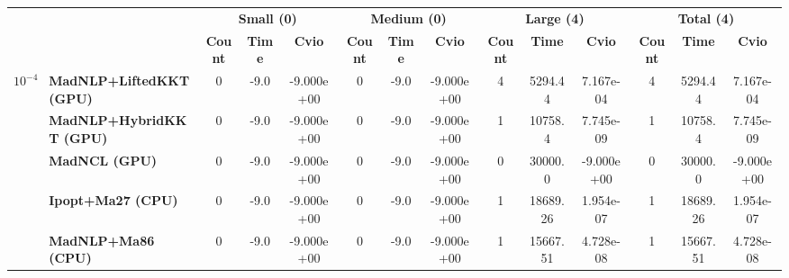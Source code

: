 \begin{center}
\renewcommand{\arraystretch}{0.9}
\begin{tabular}{|l|l|ccc|ccc|ccc|ccc|}
\hline
 & & \multicolumn{3}{c|}{\textbf{Small (0)}} & \multicolumn{3}{c|}{\textbf{Medium (0)}} & \multicolumn{3}{c|}{\textbf{Large (4)}} & \multicolumn{3}{c|}{\textbf{Total (4)}} \\
 & & \textbf{Count} & \textbf{Time} & \textbf{Cvio} & \textbf{Count} & \textbf{Time} & \textbf{Cvio} & \textbf{Count} & \textbf{Time} & \textbf{Cvio} & \textbf{Count} & \textbf{Time} & \textbf{Cvio}\\
\hline
\multirow{5}{*}{\Large\textbf{$10^{-4}$}} & \textbf{MadNLP+LiftedKKT (GPU)} & \cellcolor{blue!15}0 & \cellcolor{blue!15}-9.0 & \cellcolor{blue!15}-9.000e+00 & \cellcolor{blue!15}0 & \cellcolor{blue!15}-9.0 & \cellcolor{blue!15}-9.000e+00 & \cellcolor{blue!15}4 & \cellcolor{blue!15}5294.44 & 7.167e-04 & \cellcolor{blue!15}4 & \cellcolor{blue!15}5294.44 & 7.167e-04 \\
 & \textbf{MadNLP+HybridKKT (GPU)} & \cellcolor{blue!15}0 & \cellcolor{blue!15}-9.0 & \cellcolor{blue!15}-9.000e+00 & \cellcolor{blue!15}0 & \cellcolor{blue!15}-9.0 & \cellcolor{blue!15}-9.000e+00 & 1 & 10758.4 & 7.745e-09 & 1 & 10758.4 & 7.745e-09 \\
 & \textbf{MadNCL (GPU)} & \cellcolor{blue!15}0 & \cellcolor{blue!15}-9.0 & \cellcolor{blue!15}-9.000e+00 & \cellcolor{blue!15}0 & \cellcolor{blue!15}-9.0 & \cellcolor{blue!15}-9.000e+00 & 0 & 30000.0 & \cellcolor{blue!15}-9.000e+00 & 0 & 30000.0 & \cellcolor{blue!15}-9.000e+00 \\
 & \textbf{Ipopt+Ma27 (CPU)} & \cellcolor{blue!15}0 & \cellcolor{blue!15}-9.0 & \cellcolor{blue!15}-9.000e+00 & \cellcolor{blue!15}0 & \cellcolor{blue!15}-9.0 & \cellcolor{blue!15}-9.000e+00 & 1 & 18689.26 & 1.954e-07 & 1 & 18689.26 & 1.954e-07 \\
 & \textbf{MadNLP+Ma86 (CPU)} & \cellcolor{blue!15}0 & \cellcolor{blue!15}-9.0 & \cellcolor{blue!15}-9.000e+00 & \cellcolor{blue!15}0 & \cellcolor{blue!15}-9.0 & \cellcolor{blue!15}-9.000e+00 & 1 & 15667.51 & 4.728e-08 & 1 & 15667.51 & 4.728e-08 \\
\hline
\end{tabular}
\end{center}
